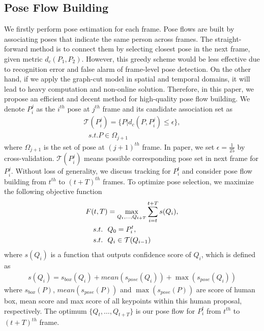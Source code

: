 \documentclass{bmvc2k}
\begin{document}
\subsection{Pose Flow Building}
We firstly perform pose estimation for each frame. Pose flows are built by associating poses that indicate the same person across frames. The straight-forward method is to connect them by selecting closest pose in the next frame, given metric $d_c(P_1,P_2)$. However, this greedy scheme would be less effective due to recognition error and false alarm of frame-level pose detection. On the other hand, if we apply the graph-cut model in spatial and temporal domains, it will lead to heavy computation and non-online solution. Therefore, in this paper, we propose an efficient and decent method for high-quality pose flow building. We denote $P_i^j$ as the $i^{th}$ pose at $j^{th}$ frame and its candidate association set as
\vspace{-1mm}
\begin{equation}
\begin{aligned}
\mathcal{T}(P_i^j) = \{P| d_c(P,P_i^j) \leq \epsilon\}, \\
~~~s.t. P \in \Omega_{j+1}
\label{eq:set}
\end{aligned}
\end{equation}
where $\Omega_{j+1}$ is the set of pose at $(j+1)^{th}$ frame. In paper, we set $\epsilon = \frac{1}{25}$ by cross-validation. $\mathcal{T}(P_i^j)$ means possible corresponding pose set in next frame for $P_i^j$. Without loss of generality, we discuss tracking for $P_i^t$ and consider pose flow building from $t^{th}$ to $(t+T)^{th}$ frames. To optimize pose selection, we maximize the following objective function
\vspace{-2mm}
\begin{equation}
\begin{aligned}
\vspace{2mm}
F(t,T)  &= \max_{Q_t,\ldots,Q_{t+T}} \sum_{i=t}^{t+T} s(Q_i),  \\
s.t.~~&Q_0 = P_i^t ,   \\
s.t.~~&Q_i \in \mathcal{T}(Q_{i-1})
\label{eq:online}
\end{aligned}
\end{equation}
where $s(Q_i)$ is a function that outputs confidence score of $Q_i$, which is defined as
\begin{equation}
\begin{aligned}
s(Q_i) = s_{box}(Q_i) + mean(s_{pose}(Q_i)) + \max(s_{pose}(Q_i))
\end{aligned}
\end{equation}
where $s_{box}(P)$, $mean(s_{pose}(P))$ and $\max(s_{pose}(P))$ are score of human box, mean score and max score of all keypoints within this human proposal, respectively. The optimum $\{Q_t,\ldots,Q_{t+T}\}$ is our pose flow for $P_i^t$ from $t^{th}$ to $(t+T)^{th}$ frame.
\vspace{-3mm}
\end{document}
